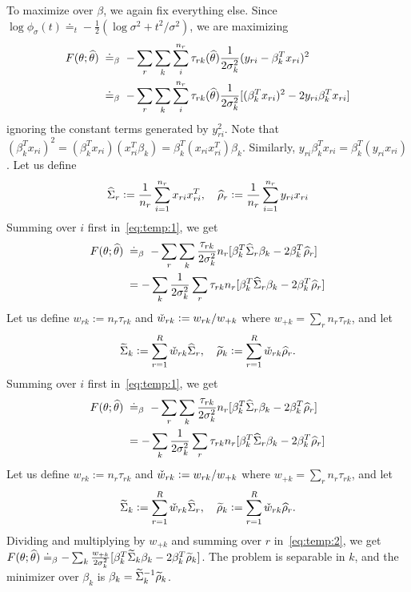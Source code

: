 \documentclass[12pt]{article}
\begin{document}
\begin{appendices}
	To maximize over $\beta$, we again fix everything else. Since $\log \phi_\sigma(t) \doteq_t -\frac12 (\log \sigma^2 + t^2/\sigma^2) $, we are maximizing
\begin{align}
	    F(\theta;\widehat\theta)\; &\doteq_\beta\; -\sum_r \sum_k \sum_i^{n_r} 
	    \tau_{rk}(\widehat\theta) \frac1{2\sigma_k^2} (y_{ri} - \beta_k^T x_{ri})^2 \notag\\
	    &\doteq_\beta\; -\sum_r \sum_k \sum_i^{n_r} 
	    \tau_{rk}(\widehat\theta) \frac1{2\sigma_k^2} [(\beta_k^T x_{ri})^2 - 2y_{ri}\beta_k^T x_{ri}] \label{eq:temp:1}
	\end{align}
	ignoring the constant terms generated by $y_{ri}^2$. Note that $(\beta_k^T x_{ri})^2 = (\beta_k^T x_{ri})(x_{ri}^T \beta_k) = \beta_k^T (x_{ri}x_{ri}^T) \beta_k$. Similarly, $y_{ri}\beta_k^T x_{ri} = \beta_k^T(y_{ri} x_{ri})$. Let us define
	\begin{align}\label{eq:hat:def}
	    \widehat{\Sigma}_r := \frac1{n_r}\sum_{i=1}^{n_r} x_{ri} x_{ri}^T, \quad 
	    \widehat\rho_r :=  \frac1{n_r}\sum_{i=1}^{n_r} y_{ri} x_{ri}
	\end{align}
Summing over $i$ first in~\eqref{eq:temp:1}, we get
	\begin{align}
	     F(\theta;\widehat\theta)\; 
	    &\doteq_\beta\; -\sum_r \sum_k
	     \frac{\tau_{rk}}{2\sigma_k^2} n_r[ \beta_k^T \widehat{\Sigma}_r \beta_k - 2 \beta_k^T \widehat\rho_r] \notag \\
	    &=  - \sum_k \frac1{2\sigma_k^2}
	     \sum_r\tau_{rk} n_r[ \beta_k^T \widehat{\Sigma}_r \beta_k - 2 \beta_k^T \widehat\rho_r]
	     \label{eq:temp:2}
	\end{align}
	Let us define $w_{rk} :=  n_r \tau_{rk}$ and $\check w_{rk} := w_{rk}/w_{+k}$ where $w_{+k} = \sum_r n_r\tau_{rk}$, and let
	\begin{align}\label{eq:tilde:def}
	    \widetilde{\Sigma}_k := \sum_{r=1}^R \check w_{rk} \widehat{\Sigma}_r, \quad 
	    \widetilde{\rho}_k := \sum_{r=1}^R \check w_{rk}  \widehat\rho_r.
	\end{align}
Summing over $i$ first in~\eqref{eq:temp:1}, we get
	\begin{align}
	     F(\theta;\widehat\theta)\; 
	    &\doteq_\beta\; -\sum_r \sum_k
	     \frac{\tau_{rk}}{2\sigma_k^2} n_r[ \beta_k^T \widehat{\Sigma}_r \beta_k - 2 \beta_k^T \widehat\rho_r] \notag \\
	    &=  - \sum_k \frac1{2\sigma_k^2}
	     \sum_r\tau_{rk} n_r[ \beta_k^T \widehat{\Sigma}_r \beta_k - 2 \beta_k^T \widehat\rho_r]
	     \label{eq:temp:2}
	\end{align}
	Let us define $w_{rk} :=  n_r \tau_{rk}$ and $\check w_{rk} := w_{rk}/w_{+k}$ where $w_{+k} = \sum_r n_r\tau_{rk}$, and let
	\begin{align}\label{eq:tilde:def}
	    \widetilde{\Sigma}_k := \sum_{r=1}^R \check w_{rk} \widehat{\Sigma}_r, \quad 
	    \widetilde{\rho}_k := \sum_{r=1}^R \check w_{rk}  \widehat\rho_r.
	\end{align}
	Dividing and multiplying by $w_{+k}$ and summing over $r$ in~\eqref{eq:temp:2}, we get
	    $F(\theta;\widehat\theta)
	    \doteq_\beta -\sum_k \frac{w_{+k}}{2\sigma_k^2} [\beta_k^T \widetilde{\Sigma}_k \beta_k - 2 \beta_k^T \widetilde{\rho}_k]$.
	The problem is separable in $k$, and the minimizer over $\beta_k$ is $\beta_k = \widetilde{\Sigma}_k^{-1} \widetilde{\rho}_k$.
	

\end{appendices}
\end{document}

